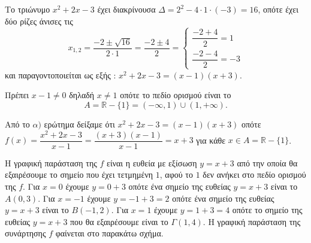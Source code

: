 
\begin{alist}
\item Το τριώνυμο $x^2 + 2x - 3$ έχει διακρίνουσα $\Delta = 2^2 - 4 \cdot 1 \cdot (-3) = 16$, οπότε έχει δύο ρίζες άνισες τις 
\[x_{1,2} = \dfrac{-2 \pm \sqrt{16}}{2 \cdot 1} = \dfrac{-2 \pm 4}{2} = \begin{cases} \dfrac{-2 + 4}{2} = 1 \\ \dfrac{-2 - 4}{2} = -3 \end{cases}\]
και παραγοντοποιείται ως εξής : $x^2 + 2x - 3 = (x - 1)(x + 3)$.
\item 
\begin{rlist}
\item Πρέπει $x - 1 \ne 0$ δηλαδή $x \ne 1$ οπότε το πεδίο ορισμού είναι το
\[A = \mathbb{R} - \{1\} = (-\infty, 1) \cup (1, +\infty).\]
\item Από το $\alpha)$ ερώτημα δείξαμε ότι $x^2 + 2x - 3 = (x - 1)(x + 3)$ οπότε
$f(x) = \dfrac{x^2 + 2x - 3}{x - 1} = \dfrac{(x + 3)(x - 1)}{x - 1} = x + 3$ για κάθε $x \in A = \mathbb{R} - \{1\}$.
\item Η γραφική παράσταση της $f$ είναι η ευθεία με εξίσωση $y = x + 3$ από την οποία θα εξαιρέσουμε το σημείο που έχει τετμημένη $1$, αφού το $1$ δεν ανήκει στο πεδίο ορισμού της $f$.
Για $x = 0$ έχουμε $y = 0 + 3$ οπότε ένα σημείο της ευθείας $y = x + 3$ είναι το $A(0,3)$.
Για $x = -1$ έχουμε $y = -1 + 3 = 2$ οπότε ένα σημείο της ευθείας $y = x + 3$ είναι το $B(-1, 2)$.
Για $x = 1$ έχουμε $y = 1 + 3 = 4$ οπότε το σημείο της ευθείας $y = x + 3$ που θα εξαιρέσουμε είναι το $\Gamma(1, 4)$.
Η γραφική παράσταση της συνάρτησης $f$ φαίνεται στο παρακάτω σχήμα.
\begin{center}
\end{center}
\end{rlist}
\end{alist}

